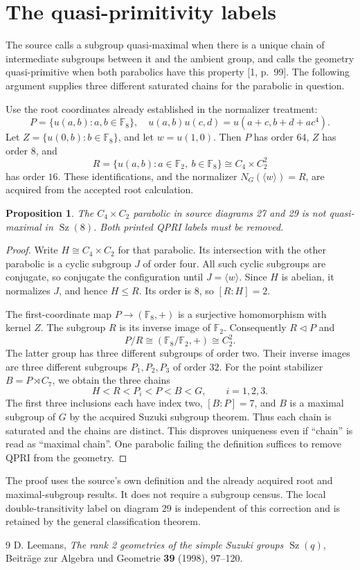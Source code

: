 \documentclass[11pt]{article}
\newtheorem{proposition}{Proposition}
\newcommand{\F}{\mathbb F}
\newcommand{\Sz}{\operatorname{Sz}}
\begin{document}
\section{The quasi-primitivity labels}
The source calls a subgroup quasi-maximal when there is a unique chain
of intermediate subgroups between it and the ambient group, and calls
the geometry quasi-primitive when both parabolics have this property
[1, p.~99]. The following argument supplies three different saturated
chains for the parabolic in question.

Use the root coordinates already established in the normalizer treatment:
\[
 P=\{u(a,b):a,b\in\F_8\},\quad
 u(a,b)u(c,d)=u(a+c,b+d+ac^4).
\]
Let $Z=\{u(0,b):b\in\F_8\}$, and let $w=u(1,0)$.
Then $P$ has order $64$, $Z$ has order $8$, and
\[
 R=\{u(a,b):a\in\F_2,\ b\in\F_8\}
   \cong C_4\times C_2^2
\]
has order $16$. These identifications, and the normalizer
$N_G(\langle w\rangle)=R$, are acquired from the accepted root calculation.

\begin{proposition}
The $C_4\times C_2$ parabolic in source diagrams 27 and 29 is not
quasi-maximal in $\Sz(8)$. Both printed QPRI labels must be removed.
\end{proposition}
\begin{proof}
Write $H\cong C_4\times C_2$ for that parabolic. Its intersection with
the other parabolic is a cyclic subgroup $J$ of order four. All such
cyclic subgroups are conjugate, so conjugate the configuration until
$J=\langle w\rangle$. Since $H$ is abelian, it normalizes $J$, and hence
$H\le R$. Its order is $8$, so $[R:H]=2$.

The first-coordinate map $P\to(\F_8,+)$ is a surjective homomorphism
with kernel $Z$. The subgroup $R$ is its inverse image of $\F_2$.
Consequently $R\lhd P$ and
\[
 P/R\cong (\F_8/\F_2,+)\cong C_2^2.
\]
The latter group has three different subgroups of order two. Their inverse
images are three different subgroups $P_1,P_2,P_3$ of order $32$.
For the point stabilizer $B=P\rtimes C_7$, we obtain the three chains
\[
 H<R<P_i<P<B<G,\qquad i=1,2,3.
\]
The first three inclusions each have index two, $[B:P]=7$, and $B$ is a
maximal subgroup of $G$ by the acquired Suzuki subgroup theorem. Thus each
chain is saturated and the chains are distinct. This disproves uniqueness
even if ``chain'' is read as ``maximal chain''. One parabolic failing the
definition suffices to remove QPRI from the geometry.
\end{proof}

The proof uses the source's own definition and the already acquired root
and maximal-subgroup results. It does not require a subgroup census. The
local double-transitivity label on diagram 29 is independent of this
correction and is retained by the general classification theorem.

\begin{thebibliography}{9}
 D. Leemans, \emph{The rank 2 geometries of the simple Suzuki
groups $\Sz(q)$}, Beitr\"age zur Algebra und Geometrie \textbf{39}
(1998), 97--120.
\end{thebibliography}
\end{document}
